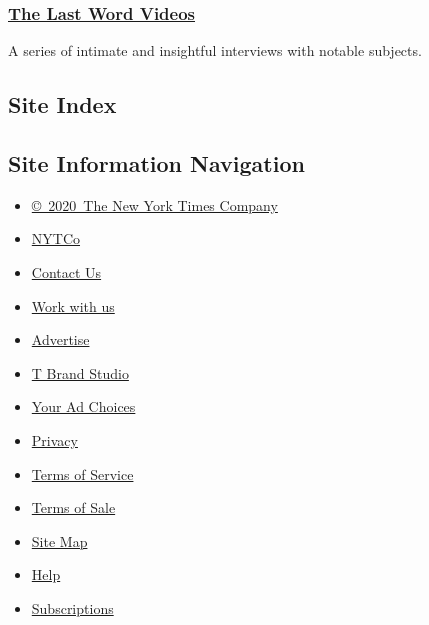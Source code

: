 \hypertarget{the-last-word-videos}{%
\subsubsection{\texorpdfstring{\href{https://www.nytimes.com/video/last-word}{The
Last Word Videos}}{The Last Word Videos}}\label{the-last-word-videos}}

A series of intimate and insightful interviews with notable subjects.

\hypertarget{site-index}{%
\subsection{Site Index}\label{site-index}}

\hypertarget{site-information-navigation}{%
\subsection{Site Information
Navigation}\label{site-information-navigation}}

\begin{itemize}
\tightlist
\item
  \href{https://help.nytimes.com/hc/en-us/articles/115014792127-Copyright-notice}{©~2020~The
  New York Times Company}
\end{itemize}

\begin{itemize}
\tightlist
\item
  \href{https://www.nytco.com/}{NYTCo}
\item
  \href{https://help.nytimes.com/hc/en-us/articles/115015385887-Contact-Us}{Contact
  Us}
\item
  \href{https://www.nytco.com/careers/}{Work with us}
\item
  \href{https://nytmediakit.com/}{Advertise}
\item
  \href{http://www.tbrandstudio.com/}{T Brand Studio}
\item
  \href{https://www.nytimes.com/privacy/cookie-policy\#how-do-i-manage-trackers}{Your
  Ad Choices}
\item
  \href{https://www.nytimes.com/privacy}{Privacy}
\item
  \href{https://help.nytimes.com/hc/en-us/articles/115014893428-Terms-of-service}{Terms
  of Service}
\item
  \href{https://help.nytimes.com/hc/en-us/articles/115014893968-Terms-of-sale}{Terms
  of Sale}
\item
  \href{https://spiderbites.nytimes.com}{Site Map}
\item
  \href{https://help.nytimes.com/hc/en-us}{Help}
\item
  \href{https://www.nytimes.com/subscription?campaignId=37WXW}{Subscriptions}
\end{itemize}
